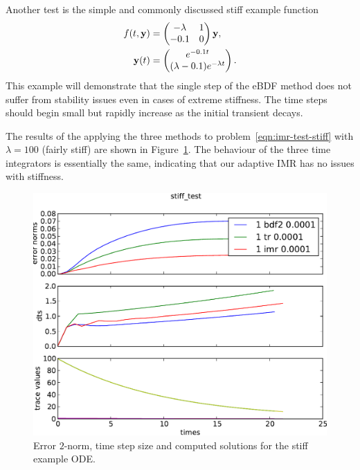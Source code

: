 Another test is the simple and commonly discussed stiff example function \cite{??ds Iserles?}
\begin{equation}
  \label{eqn:imr-test-stiff}
  \begin{aligned}
    f(t, \mathbf{y}) &= \begin{pmatrix}
     -\lambda & 1 \\
      -0.1 & 0 \\
    \end{pmatrix}   \mathbf{y}, \\
    \mathbf{y}(t) &= 
    \begin{pmatrix} e^{-0.1t} \\ (\lambda - 0.1)e^{-\lambda t} \end{pmatrix}.
  \end{aligned}
\end{equation} 
This example will demonstrate that the single step of the eBDF method does not suffer from stability issues even in cases of extreme stiffness.
The time steps should begin small but rapidly increase as the initial transient decays.

The results of the applying the three methods to problem~\eqref{eqn:imr-test-stiff} with $\lambda = 100$ (fairly stiff) are shown in Figure~\ref{fig:imr-stiff-example}.
The behaviour of the three time integrators is essentially the same, indicating that our adaptive IMR has no issues with stiffness.

\begin{figure}[h!]
  \centering
  \includegraphics[width=1\textwidth]{aimr/stiff_test-errornormsvs-dtsvs-tracevaluesvstimes}
  \caption{Error $2$-norm, time step size and computed solutions for the stiff example ODE.}
  \label{fig:imr-stiff-example}
\end{figure}

